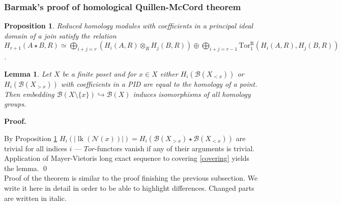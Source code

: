 \documentclass[english,12pt]{article}
\newcounter{stmcounter}[section]
\numberwithin{equation}{section}
\newtheorem{proposition}[stmcounter]{Proposition}
\newtheorem{lemma}[stmcounter]{Lemma}
\theoremstyle{definition}
\theoremstyle{remark}
\newenvironment{pf}{\noindent\textbf{Proof.}}{\qed}
\begin{document}
\subsubsection{Barmak's proof of homological Quillen-McCord theorem}

\begin{proposition} {\cite[Lemma 2.1]{Milnor56}}
  \label{prop:kunneth}
  Reduced homology modules with coefficients in a principal ideal domain of a join satisfy the relation
  $H_{r+1}(A \star B, R) \simeq \bigoplus_{i+j=r}(H_i(A,R) \otimes_R H_j(B,R)) \oplus \bigoplus_{i+j=r-1} \operatorname{Tor_1^R}(H_i(A,R),H_j(B,R))$.
\end{proposition}

\begin{lemma}
  \label{lem:trivialties}
  Let $X$ be a finite poset and for $x \in X$ either $H_i(\mathcal{B}(X_{< x}))$ or $H_i(\mathcal{B}(X_{> x}))$ with coefficients in a PID are equal to the homology of a point. Then embedding $\mathcal{B}(X \setminus \{x\}) \hookrightarrow \mathcal{B}(X)$ induces isomorphisms of all homology groups.
\end{lemma}

\begin{pf} ~ \par
  By Proposition \ref{prop:kunneth} $H_i(\left|\operatorname{lk}(\mathcal{N}(x))\right|) = H_i(\mathcal{B}(X_{>x}) \star \mathcal{B}(X_{<x}))$ are trivial for all indices $i$ --- $Tor$-functors vanish if any of their arguments is trivial.
  Application of Mayer-Vietoris long exact sequence to covering \eqref{covering} yields the lemma.
\end{pf}\\

Proof of the theorem is similar to the proof finishing the previous subsection. We write it here in detail in order to be able to highlight differences. Changed parts are written in italic.\\
\end{document}
